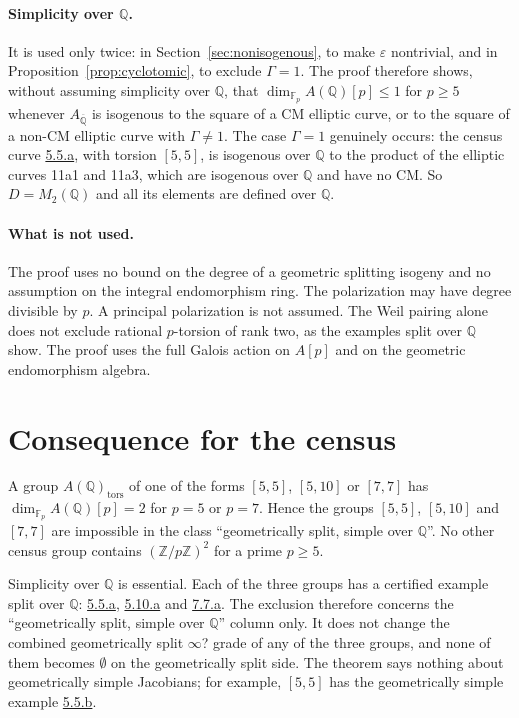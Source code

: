 \documentclass[11pt]{article}
\newcommand{\Q}{\mathbb Q}
\newcommand{\Z}{\mathbb Z}
\newcommand{\F}{\mathbb F}
\begin{document}
\paragraph{Simplicity over \(\Q\).} It is used only twice: in
Section~\ref{sec:nonisogenous}, to make \(\varepsilon\) nontrivial, and
in Proposition~\ref{prop:cyclotomic}, to exclude \(\Gamma=1\). The
proof therefore shows, without assuming simplicity over \(\Q\), that
\(\dim_{\F_p}A(\Q)[p]\leq1\) for \(p\geq5\) whenever
\(A_{\overline{\Q}}\) is isogenous to the square of a CM elliptic
curve, or to the square of a non-CM elliptic curve with
\(\Gamma\neq1\). The case \(\Gamma=1\) genuinely occurs: the census
curve \href{https://genus-2-torsion.github.io/curve.html?id=5.5.a}{5.5.a},
with torsion \([5,5]\), is isogenous over \(\Q\) to the product of the
elliptic curves 11a1 and 11a3, which are isogenous over \(\Q\) and have
no CM. So \(D=M_2(\Q)\) and all its elements are defined over \(\Q\).

\paragraph{What is not used.} The proof uses no bound on the degree of
a geometric splitting isogeny and no assumption on the integral
endomorphism ring. The polarization may have degree divisible by
\(p\). A principal polarization is not assumed. The Weil pairing alone
does not exclude rational \(p\)-torsion of rank two, as the examples
split over \(\Q\) show. The proof uses the full Galois action on
\(A[p]\) and on the geometric endomorphism algebra.

\section{Consequence for the census}

A group \(A(\Q)_{\mathrm{tors}}\) of one of the forms \([5,5]\),
\([5,10]\) or \([7,7]\) has \(\dim_{\F_p}A(\Q)[p]=2\) for \(p=5\) or
\(p=7\). Hence the groups
\href{https://genus-2-torsion.github.io/group.html?g=5.5}{\([5,5]\)},
\href{https://genus-2-torsion.github.io/group.html?g=5.10}{\([5,10]\)}
and
\href{https://genus-2-torsion.github.io/group.html?g=7.7}{\([7,7]\)}
are impossible in the class ``geometrically split, simple over \(\Q\)''.
No other census group contains \((\Z/p\Z)^2\) for a prime \(p\geq5\).

Simplicity over \(\Q\) is essential. Each of the three groups has a
certified example split over \(\Q\):
\href{https://genus-2-torsion.github.io/curve.html?id=5.5.a}{5.5.a},
\href{https://genus-2-torsion.github.io/curve.html?id=5.10.a}{5.10.a}
and
\href{https://genus-2-torsion.github.io/curve.html?id=7.7.a}{7.7.a}.
The exclusion therefore concerns the ``geometrically split, simple over
\(\Q\)'' column only. It does not change the combined geometrically
split \(\infty\)? grade of any of the three groups, and none of them
becomes \(\emptyset\) on the geometrically split side. The theorem says
nothing about geometrically simple Jacobians; for example, \([5,5]\) has
the geometrically simple example
\href{https://genus-2-torsion.github.io/curve.html?id=5.5.b}{5.5.b}.
\end{document}
